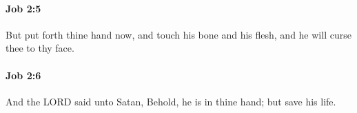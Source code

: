 		\paragraph{Job 2:5} %
			\label{JOB-2-5}

			But put forth thine hand now, and touch his bone and his flesh, and he will curse thee to thy face.


		\paragraph{Job 2:6} %
			\label{JOB-2-6}

			And the LORD said unto Satan, Behold, he is in thine hand; but save his life.


